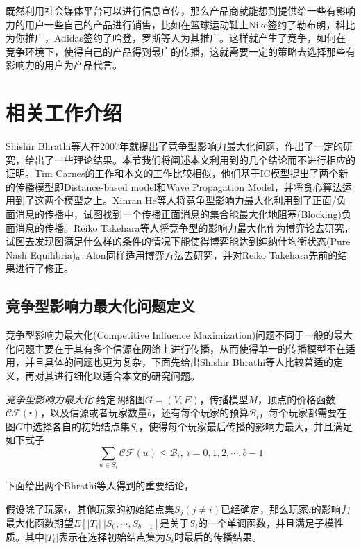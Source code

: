 既然利用社会媒体平台可以进行信息宣传，那么产品商就能想到提供给一些有影响力的用户一些自己的产品进行销售，比如在篮球运动鞋上Nike签约了勒布朗，科比为你推广，Adidas签约了哈登，罗斯等人为其推广。这样就产生了竞争，如何在竞争环境下，使得自己的产品得到最广的传播，这就需要一定的策略去选择那些有影响力的用户为产品代言。

\section{相关工作介绍}
Shishir Bhrathi\cite{bharathi2007competitive}等人在2007年就提出了竞争型影响力最大化问题，作出了一定的研究，给出了一些理论结果。本节我们将阐述本文利用到的几个结论而不进行相应的证明。Tim Carnes\cite{carnes2007maximizing}的工作和本文的工作比较相似，他们基于IC模型提出了两个新的传播模型即Distance-based model和Wave Propagation Model，并将贪心算法运用到了这两个模型之上。Xinran He\cite{he2012influence}等人将竞争型影响力最大化利用到了正面/负面消息的传播中，试图找到一个传播正面消息的集合能最大化地阻塞(Blocking)负面消息的传播。Reiko Takehara\cite{takehara2012comment}等人将竞争型的影响力最大化作为博弈论去研究，试图去发现图满足什么样的条件的情况下能使得博弈能达到纯纳什均衡状态(Pure Nash Equilibria)。Alon\cite{alon2010note}同样适用博弈方法去研究，并对Reiko Takehara先前的结果进行了修正。


\subsection{竞争型影响力最大化问题定义}
\label{sec:chap4:def-for-problem}
竞争型影响力最大化(Competitive Influence Maximization)问题不同于一般的最大化问题主要在于其有多个信源在网络上进行传播，从而使得单一的传播模型不在适用，并且具体的问题也更为复杂，下面先给出Shishir Bhrathi\cite{bharathi2007competitive}等人比较普适的定义，再对其进行细化以适合本文的研究问题。

\begin{definition}
\label{def:chap4-bhrathi-kempe-cim}
\emph{竞争型影响力最大化}
给定网络图$G=(V,E)$，传播模型$M$，顶点的价格函数$\mathcal{CF}(\centerdot)$，以及信源或者玩家数量$b$，还有每个玩家的预算$\mathcal{B}_{i}$，每个玩家都需要在图$G$中选择各自的初始结点集$S_{i}$，使得每个玩家最后传播的影响力最大，并且满足如下式子
\begin{displaymath}
\sum_{u \in S_{i}}\mathcal{CF}(u) \leq \mathcal{B}_{i}, ~i=0,1,2,\cdots,b-1
\end{displaymath}
\end{definition}


下面给出两个Bhrathi\cite{bharathi2007competitive}等人得到的重要结论，
\begin{lemma}
\label{lemma:chap4-functionalities}
假设除了玩家$i$，其他玩家的初始结点集$S_{j}(j \neq i)$已经确定，那么玩家$i$的影响力最大化函数期望$E[|T_{i}|~|S_{0},\cdots ,S_{b-1}]$是关于$S_{i}$的一个单调函数，并且满足子模性质。其中$|T_{i}|$表示在选择初始结点集为$S_{i}$时最后的传播结果。
\end{lemma}


